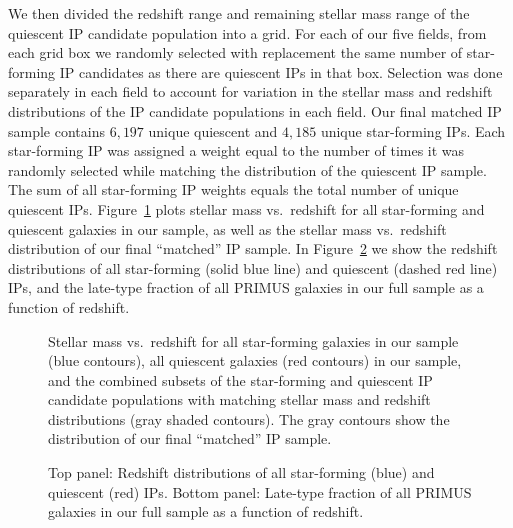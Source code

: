 We then divided the redshift range and remaining stellar mass range of the quiescent IP candidate population into a grid.
For each of our five fields, from each grid box we randomly selected with replacement the same number of star-forming IP candidates as there are quiescent IPs in that box.
Selection was done separately in each field to account for variation in the stellar mass and redshift distributions of the IP candidate populations in each field.
Our final matched IP sample contains $6,197$ unique quiescent and $4,185$ unique star-forming IPs.
Each star-forming IP was assigned a weight equal to the number of times it was randomly selected while matching the distribution of the quiescent IP sample.
The sum of all star-forming IP weights equals the total number of unique quiescent IPs.
Figure~\ref{fig:IPsample_matched} plots stellar mass vs.~redshift for all star-forming and quiescent galaxies in our sample, 
as well as the stellar mass vs.~redshift distribution of our final ``matched'' IP sample.
In Figure~\ref{fig:IPhist_latefrac_vs_z} we show the redshift distributions of all star-forming (solid blue line) and quiescent (dashed red line) IPs, and the late-type fraction of all PRIMUS galaxies in our full sample as a function of redshift.

\begin{figure}
  \epstrim{0.6in 0.2in 0.2in 0.4in}
  \caption{Stellar mass vs.~redshift for all star-forming galaxies in our sample (blue contours), all quiescent galaxies (red contours) in our sample, and the combined subsets of the star-forming and quiescent IP candidate populations with matching stellar mass and redshift distributions (gray shaded contours).
The gray contours show the distribution of our final ``matched'' IP sample.
}
  \label{fig:IPsample_matched}
\end{figure}

\begin{figure}
  \epstrim{0.1in 0.1in 0.5in 0.8in}
  \caption{Top panel: Redshift distributions of all star-forming (blue) and quiescent (red) IPs.
Bottom panel: Late-type fraction of all PRIMUS galaxies in our full sample as a function of redshift.
}
  \label{fig:IPhist_latefrac_vs_z}
\end{figure}


